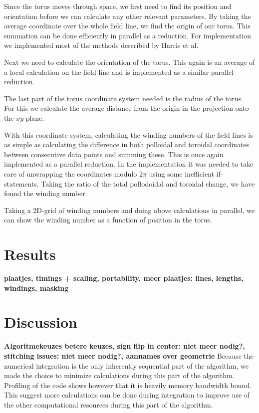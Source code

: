\documentclass{article}
\begin{document}
Since the torus moves through space, we first need to find its position and orientation before we can calculate any other relevant parameters.
By taking the average coordinate over the whole field line, we find the origin of our torus. This summation can be done efficiently in parallel as a reduction. For implementation we implemented most of the methods described by Harris et al.~\cite{harris2007optimizing}

Next we need to calculate the orientation of the torus. This again is an average of a local calculation on the field line and is implemented as a similar parallel reduction.

The last part of the torus coordinate system needed is the radius of the torus. For this we calculate the average distance from the origin in the projection onto the $xy$-plane. %

With this coordinate system, calculating the winding numbers of the field lines is as simple as calculating the difference in both polloidal and toroidal coordinates between consecutive data points and summing these. This is once again implemented as a parallel reduction. In the implementation it was needed to take care of unwrapping the coordinates modulo $2\pi$ using some inefficient if-statements. %
Taking the ratio of the total pollodoidal and toroidal change, we have found the winding number.

Taking a 2D-grid of winding numbers and doing above calculations in parallel, we can show the winding number as a function of position in the torus.
\section{Results}
{\bf plaatjes, timings + scaling, portability, meer plaatjes: lines, lengths, windings, masking}
\section{Discussion}
{\bf Algoritmekeuzes \textrightarrow betere keuzes, sign flip in center: niet meer nodig?, stitching issues: niet meer nodig?, aannames over geometrie}
Because the numerical integration is the only inherently sequential part of the algorithm, we made the choice to minimize calculations during this part of the algorithm. Profiling of the code shows however that it is heavily memory bandwidth bound. This suggest more calculations can be done during integration to improve use of the other computational resources during this part of the algorithm.
\end{document}
